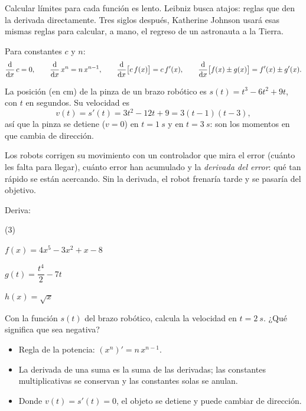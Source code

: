 \documentclass[11pt]{article}
\begin{document}
\label{tema:reglas}

\begin{hilo}
Calcular límites para cada función es lento. Leibniz busca atajos: reglas
que den la derivada directamente. Tres siglos después, Katherine Johnson
usará esas mismas reglas para calcular, a mano, el regreso de un
astronauta a la Tierra.
\end{hilo}

\begin{teorema}
Para constantes $c$ y $n$:
\[
  \frac{\mathrm{d}}{\mathrm{d}x}\,c = 0, \qquad
  \frac{\mathrm{d}}{\mathrm{d}x}\,x^n = n\,x^{n-1}, \qquad
  \frac{\mathrm{d}}{\mathrm{d}x}\bigl[c\,f(x)\bigr] = c\,f'(x), \qquad
  \frac{\mathrm{d}}{\mathrm{d}x}\bigl[f(x)\pm g(x)\bigr] = f'(x)\pm g'(x).
\]
\end{teorema}

\begin{ejemplo}
La posición (en \unit{cm}) de la pinza de un brazo robótico es
$s(t) = t^3 - 6t^2 + 9t$, con $t$ en segundos. Su velocidad es
\[
  v(t) = s'(t) = 3t^2 - 12t + 9 = 3(t-1)(t-3),
\]
así que la pinza se detiene ($v=0$) en $t=\qty{1}{s}$ y en $t=\qty{3}{s}$:
son los momentos en que cambia de dirección.
\end{ejemplo}

\begin{aplicacion}[Robótica]
Los robots corrigen su movimiento con un controlador que mira el error
(cuánto les falta para llegar), cuánto error han acumulado y la
\emph{derivada del error}: qué tan rápido se están acercando. Sin la
derivada, el robot frenaría tarde y se pasaría del objetivo.
\end{aplicacion}

\begin{preguntas}
\pregunta Deriva:
\begin{opciones*}(3)
  \item $f(x)=4x^5-3x^2+x-8$
  \item $g(t)=\dfrac{t^4}{2}-7t$
  \item $h(x)=\sqrt{x}$
\end{opciones*}
\espacio{3cm}
\pregunta Con la función $s(t)$ del brazo robótico, calcula la velocidad
en $t=\qty{2}{s}$. ¿Qué significa que sea negativa?
\espacio{3cm}
\end{preguntas}

\begin{resumen}
\begin{itemize}
  \item Regla de la potencia: $(x^n)' = n\,x^{n-1}$.
  \item La derivada de una suma es la suma de las derivadas; las
        constantes multiplicativas se conservan y las constantes solas se anulan.
  \item Donde $v(t)=s'(t)=0$, el objeto se detiene y puede cambiar de dirección.
\end{itemize}
\end{resumen}
\end{document}
